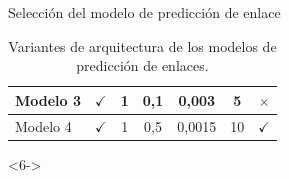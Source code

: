 \documentclass{beamer}
\begin{document}
\begin{frame}{Selección del modelo de predicción de enlace}
\begin{onlyenv}
\begin{table}
\begin{center}
{\begin{tabular}{|l|c|c|c|c|c|c|}
                Modelo 3	             & $\checkmark$	 &  1       & 0,1              & 0,003             & 5	       & $\times$            \\ \hline
                Modelo 4	             & $\checkmark$	 &  1       & 0,5              & 0,0015            & 10	       & $\checkmark$        \\ \hline
                \end{tabular}
                }
            \caption{Variantes de arquitectura de los modelos de predicción de enlaces.}
            \end{center}
        \end{table}
    \end{onlyenv}
    \begin{onlyenv}<6->
        \begin{table}
            \begin{center}
            \caption{Métricas de predicción de relaciones de las pruebas del predictor de enlace.}\label{table:test_relation_metrics_link_predictor}
            \end{center}
        \end{table}
    \end{onlyenv}
\end{frame}
\end{document}
